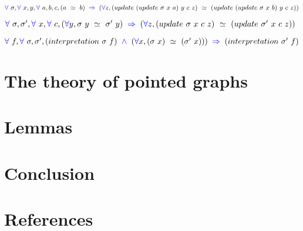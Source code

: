 \documentclass[a4paper]{article}
\begin{document}
\begin{theorem}
$\fa \ \sigma, \fa \ x, y, \fa \ a, b, c, (a \ \simeq \ b) \ \imp \ (\fa z, (update \ (update \ \sigma \ x \ a) \ y \ c \ z) \ \simeq \ (update \  (update \ \sigma \ x \ b) \ y \ c \ z))$
\end{theorem}

\begin{theorem}
$\fa \ \sigma, \sigma', \fa \ x, \fa \ c, (\fa y, \sigma \ y \ \simeq \ \sigma' \ y) \ \imp \ (\fa z, (update \ \sigma \ x \ c \ z) \ \simeq \ (update \ \sigma' \ x \ c \ z))$
\end{theorem}

\begin{theorem}
$\fa \ f, \fa \ \sigma, \sigma', (interpretation \ \sigma \ f) \ \conj \ (\fa x, (\sigma \ x) \ \simeq \ (\sigma' \ x))) \ \imp \ (interpretation \ \sigma' \ f)$
\end{theorem}

\section{The theory of pointed graphs}


\section{Lemmas}


\section{Conclusion}


\section*{References}
\end{document}
